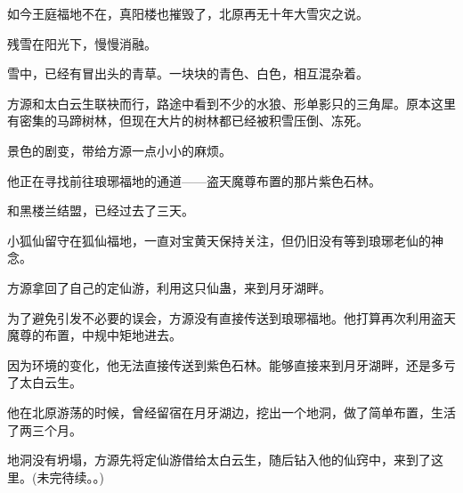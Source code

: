 \begin{this_body}
如今王庭福地不在，真阳楼也摧毁了，北原再无十年大雪灾之说。

残雪在阳光下，慢慢消融。

雪中，已经有冒出头的青草。一块块的青色、白色，相互混杂着。

方源和太白云生联袂而行，路途中看到不少的水狼、形单影只的三角犀。原本这里有密集的马蹄树林，但现在大片的树林都已经被积雪压倒、冻死。

景色的剧变，带给方源一点小小的麻烦。

他正在寻找前往琅琊福地的通道——盗天魔尊布置的那片紫色石林。

和黑楼兰结盟，已经过去了三天。

小狐仙留守在狐仙福地，一直对宝黄天保持关注，但仍旧没有等到琅琊老仙的神念。

方源拿回了自己的定仙游，利用这只仙蛊，来到月牙湖畔。

为了避免引发不必要的误会，方源没有直接传送到琅琊福地。他打算再次利用盗天魔尊的布置，中规中矩地进去。

因为环境的变化，他无法直接传送到紫色石林。能够直接来到月牙湖畔，还是多亏了太白云生。

他在北原游荡的时候，曾经留宿在月牙湖边，挖出一个地洞，做了简单布置，生活了两三个月。

地洞没有坍塌，方源先将定仙游借给太白云生，随后钻入他的仙窍中，来到了这里。(未完待续。。)

\end{this_body}

